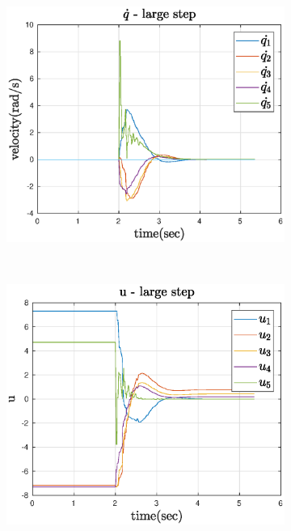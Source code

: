 \begin{figure}[htbp]
\begin{subfigure}[htbp]{0.45\textwidth}
    \end{subfigure}
    ~
    \centering
    \begin{subfigure}[htbp]{0.45\textwidth}
        \centering
        \includegraphics[width = \picsSiz\linewidth]{img/LSqdot.eps}
        \caption{ }
    \end{subfigure}
    ~ 
    \begin{subfigure}[htbp]{0.45\textwidth}
        \centering
        \includegraphics[width = \picsSiz\linewidth]{img/LSu.eps}

\end{subfigure}
\end{figure}
